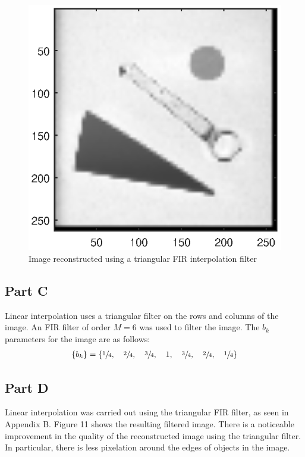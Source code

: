 \documentclass{article}
\begin{document}
\begin{figure}[H]
\begin{minipage}{0.5\linewidth}
		\includegraphics[scale=0.8]{fig11}
		\caption{Image reconstructed using a triangular FIR interpolation filter}
	\end{minipage}
\end{figure}

\subsection{Part C}
Linear interpolation uses a triangular filter on the rows and columns of the image. An FIR filter of order $M=6$ was used to filter the image. The $b_k$ parameters for the image are as follows:
\begin{align*}
	\{b_k\} = \{\sfrac{1}{4}, \quad \sfrac{2}{4}, \quad \sfrac{3}{4}, \quad 1, \quad \sfrac{3}{4}, \quad \sfrac{2}{4}, \quad \sfrac{1}{4}\}
\end{align*}

\subsection{Part D}
Linear interpolation was carried out using the triangular FIR filter, as seen in Appendix B. Figure 11 shows the resulting filtered image. There is a noticeable improvement in the quality of the reconstructed image using the triangular filter. In particular, there is less pixelation around the edges of objects in the image.
\end{document}
